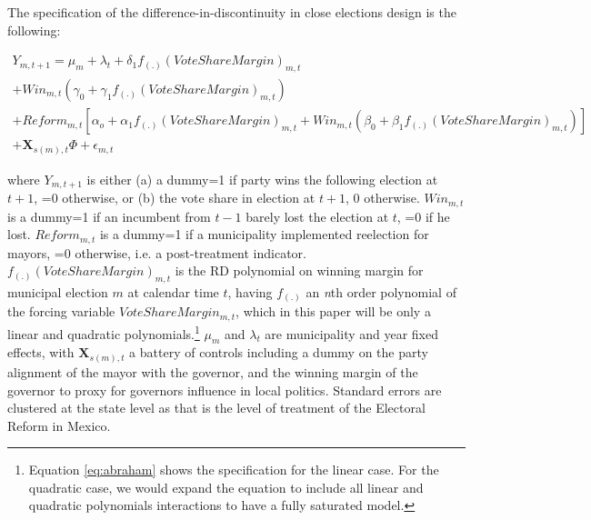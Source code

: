 \documentclass[12pt]{amsart}
\numberwithin{equation}{section}
\theoremstyle{definition}
\theoremstyle{definition}
\theoremstyle{definition}
\begin{document}
The specification of the difference-in-discontinuity in close elections design is the following:

\begin{equation}
\label{eq:abraham}
\begin{split}
Y_{m,t+1}=\mu_m + \lambda_t + \delta_1 f_{(.)}(VoteShareMargin)_{m,t} \\  
+ Win_{m,t}(\gamma_0 + \gamma_1 f_{(.)}(VoteShareMargin)_{m,t}) \\ + Reform_{m,t}[\alpha_o + \alpha_1f_{(.)}(VoteShareMargin)_{m,t} 
+ Win_{m,t}(\beta_0 + \beta_1 f_{(.)}(VoteShareMargin)_{m,t} )] \\ + \mathbf{X}_{s(m),t} \Phi + \epsilon_{m,t}
\end{split}
\end{equation}   

where $Y_{m,t+1}$ is either (a) a dummy=1 if party wins the following election at $t+1$, =0 otherwise, or (b) the vote share in election at $t+1$, 0 otherwise. $Win_{m,t}$ is a dummy=1 if an incumbent from $t-1$ barely lost the election at $t$, =0 if he lost. $Reform_{m,t}$ is a dummy=1 if a municipality implemented reelection for mayors, =0 otherwise, i.e. a post-treatment indicator. $f_{(.)}(VoteShareMargin)_{m,t}$ is the RD polynomial on winning margin for municipal election $m$ at calendar time $t$, having $f_{(.)}$ an \emph{n}th order polynomial of the forcing variable $VoteShareMargin_{m,t}$, which in this paper will be only a linear and quadratic polynomials.\footnote{Equation \ref{eq:abraham} shows the specification for the linear case. For the quadratic case, we would expand the equation to include all linear and quadratic polynomials interactions to have a fully saturated model.} $\mu_m$ and $\lambda_t$ are municipality and year fixed effects, with $\mathbf{X}_{s(m),t}$ a battery of controls including a dummy on the party alignment of the mayor with the governor, and the winning margin of the governor to proxy for governors influence in local politics. Standard errors are clustered at the state level as that is the level of treatment of the Electoral Reform in Mexico. 
\end{document}
